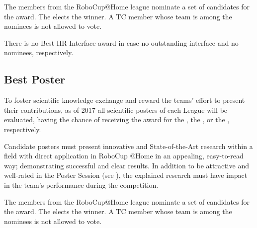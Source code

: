 The  members from the RoboCup@Home league nominate a set of candidates for the award. The  elects the winner. A TC member whose team is among the nominees is not allowed to vote.

There is no Best HR Interface award in case no outstanding interface and no nominees, respectively.

\subsection{Best Poster}
\label{award:poster}
To foster scientific knowledge exchange and reward the teams' effort to present their contributions, as of 2017 all scientific posters of each League will be evaluated, having the chance of receiving the award for the , the , or the , respectively.

Candidate posters must present innovative and State-of-the-Art research within a field with direct application in RoboCup @Home in an appealing, easy-to-read way; demonstrating successful and clear results. In addition to be attractive and well-rated in the Poster Session (see ), the explained research must have impact in the team's performance during the competition.

The  members from the RoboCup@Home league nominate a set of candidates for the award. The  elects the winner. A TC member whose team is among the nominees is not allowed to vote.

%
%
%

